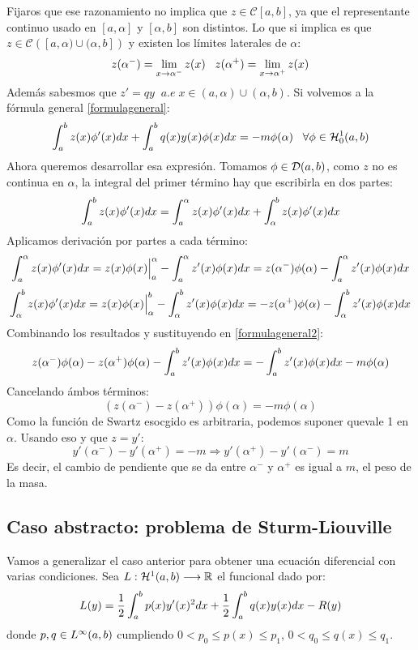 Fijaros que ese razonamiento no implica que $z\in\mathcal{C}[a,b]$, ya que el representante continuo usado en $[a,\alpha]$ y $[\alpha,b]$ son distintos. Lo que si implica es que $z\in\mathcal{C}\left([a,\alpha)\cup(\alpha,b]\right)$ y existen los límites laterales de $\alpha$:
\[
z(\alpha^-)=\displaystyle\lim_{ x \to \alpha^- } z(x) \;\;\; z(\alpha^+)=\displaystyle\lim_{ x \to \alpha^+ } z(x)
\]
Además sabesmos que $z'=qy \;\; a.e \; x \in(a,\alpha)\cup(\alpha,b)$. Si volvemos a la fórmula general \eqref{formulageneral}:
\begin{equation}
\label{formulageneral2}
\displaystyle\int_{ a }^{ b } z(x)\phi'(x)dx+\displaystyle\int_{ a }^{ b } q(x)y(x)\phi(x)dx=-m\phi(\alpha) \;\;\; \forall\phi\in\mathcal{H}_0^{ 1 } (a,b)
\end{equation}
Ahora queremos desarrollar esa expresión. Tomamos $\phi\in\mathcal{D}(a,b)$, como $z$ no es continua en $\alpha$, la integral del primer término hay que escribirla en dos partes:
\[
\displaystyle\int_{ a }^{ b } z(x)\phi'(x)dx=\displaystyle\int_{ a }^{ \alpha } z(x)\phi'(x)dx+\displaystyle\int_{ \alpha }^{ b } z(x)\phi'(x)dx
\]
Aplicamos derivación por partes a cada término:
\[
\displaystyle\int_{ a }^{ \alpha } z(x)\phi'(x)dx=z(x)\phi(x)\Big|_a^\alpha-\displaystyle\int_{ a }^{ \alpha } z'(x)\phi(x)dx=z(\alpha^-)\phi(\alpha)-\displaystyle\int_{ a }^{ \alpha } z'(x)\phi(x)dx
\]
\[
\displaystyle\int_{ \alpha }^{ b } z(x)\phi'(x)dx=z(x)\phi(x)\Big|_\alpha^b-\displaystyle\int_{ \alpha }^{ b } z'(x)\phi(x)dx=-z(\alpha^+)\phi(\alpha)-\displaystyle\int_{ \alpha }^{ b } z'(x)\phi(x)dx
\]
Combinando los resultados y sustituyendo en \eqref{formulageneral2}:
\[
z(\alpha^-)\phi(\alpha)-z(\alpha^+)\phi(\alpha)-\displaystyle\int_{ a }^{ b } z'(x)\phi(x)dx=-\displaystyle\int_{ a }^{ b } z'(x)\phi(x)dx-m\phi(\alpha)
\]
Cancelando ámbos términos:
\[
\left(z(\alpha^-)-z(\alpha^+)\right)\phi(\alpha)=-m\phi(\alpha)
\]
Como la función de Swartz esocgido es arbitraria, podemos suponer quevale 1 en $\alpha$. Usando eso y que $z=y'$:
\[
y'(\alpha^-)-y'(\alpha^+)=-m \Rightarrow y'(\alpha^+)-y'(\alpha^-)=m  
\]
Es decir, el cambio de pendiente que se da entre $\alpha^-$ y $\alpha^+$ es igual a $m$, el peso de la masa.

\subsection{Caso abstracto: problema de Sturm-Liouville}
Vamos a generalizar el caso anterior para obtener una ecuación diferencial con varias condiciones. Sea $L : \mathcal{H}^{ 1 } (a,b) \longrightarrow \mathbb{R}$ el funcional dado por:
\[
L(y)=\frac{1}{2}\displaystyle\int_{ a }^{ b } p(x)y'(x)^2dx+\frac{1}{2}\displaystyle\int_{ a }^{ b } q(x)y(x)dx-R(y)
\]
donde $p,q\in L^{ \infty }(a,b)$ cumpliendo $0<p_0\leq p(x)\leq p_1$, $0<q_0\leq q(x)\leq q_1$. 

